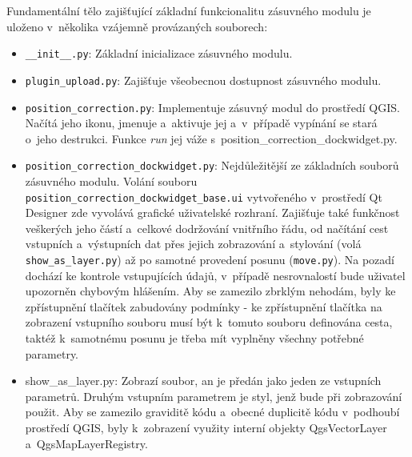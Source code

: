 Fundamentální tělo zajišťující základní funkcionalitu zásuvného modulu je ulože\-no v~několika vzájemně
provázaných souborech: 
\begin{itemize}

	\item {\tt \_\_init\_\_.py}: Základní inicializace zásuvného modulu. 

	\item {\tt plugin\_upload.py}: Zajišťuje všeobecnou dostupnost zásuvného modulu. 	

	\item {\tt position\_correction.py}: Implementuje zásuvný modul do prostředí QGIS. Načítá jeho ikonu,
	jmenuje a~aktivuje jej a~v~případě vypínání se stará o~jeho destrukci. Funkce \textit{run} jej váže
	s~position\_correction\_dockwidget.py. 
	
	\item {\tt position\_correction\_dockwidget.py}: Nejdůle\-žitěj\-ší
	ze základních souborů zá\-suvného modulu. Volání
	souboru {\tt position\_correction\_dockwidget\_base.ui}
	vytvoře\-ného v~prostředí Qt Designer
	zde vyvolává grafické uživatelské rozhraní. Zajišťuje
	také funkčnost ve\-škerých jeho částí a~celkové
	dodržování vnitřního řádu, od načítání cest vstupních
	a~výstupních dat přes jejich zobrazování a~stylování (volá
	{\tt show\_as\_layer.py}) až po samotné provedení posunu ({\tt move.py}).
	Na pozadí dochází ke kontrole vstupujících údajů, v~případě nesrovnalostí
	bude uživatel u\-pozorněn chybovým hlášením. Aby se zamezilo zbrklým nehodám, byly ke zpřístupnění
	tlačítek zabudovány podmínky - ke zpřístupnění tlačítka na zobrazení vstupního souboru musí být
	k~tomuto souboru definována cesta, taktéž k~samotnému posunu je třeba mít vyplněny všechny potřebné
	parametry. 
	
	\item show\_as\_layer.py: Zobrazí soubor, an je předán jako jeden ze vstupních parame\-trů. Druhým
	vstupním parametrem je styl, jenž bude při zobrazování použit. Aby se zamezilo graviditě kódu
	a~obecné duplicitě kódu v~podhoubí prostředí QGIS, byly k~zobrazení využity interní objekty
	QgsVectorLayer a~QgsMapLayerRegistry. 

\end{itemize}


